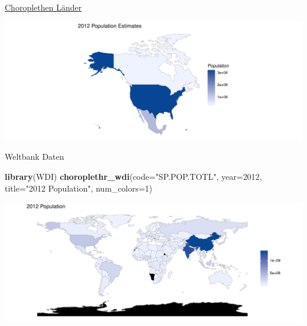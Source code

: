 \documentclass[ignorenonframetext,]{beamer}
\newenvironment{Shaded}{\begin{snugshade}}{\end{snugshade}}
\newcommand{\DataTypeTok}[1]{\textcolor[rgb]{0.13,0.29,0.53}{#1}}
\newcommand{\DecValTok}[1]{\textcolor[rgb]{0.00,0.00,0.81}{#1}}
\newcommand{\KeywordTok}[1]{\textcolor[rgb]{0.13,0.29,0.53}{\textbf{#1}}}
\newcommand{\NormalTok}[1]{#1}
\newcommand{\StringTok}[1]{\textcolor[rgb]{0.31,0.60,0.02}{#1}}
\begin{document}
\begin{frame}{\href{http://mirrors.softliste.de/cran/web/packages/choroplethr/vignettes/d-country-choropleth.html}{Choroplethen
Länder}}
\protect\hypertarget{choroplethen-lander-1}{}

\includegraphics{Choroplethen_files/figure-beamer/unnamed-chunk-26-1.pdf}

\end{frame}

\begin{frame}[fragile]{Weltbank Daten}
\protect\hypertarget{weltbank-daten}{}

\begin{Shaded}
\begin{Highlighting}[]
\KeywordTok{library}\NormalTok{(WDI) }
\KeywordTok{choroplethr_wdi}\NormalTok{(}\DataTypeTok{code=}\StringTok{"SP.POP.TOTL"}\NormalTok{, }\DataTypeTok{year=}\DecValTok{2012}\NormalTok{, }
                \DataTypeTok{title=}\StringTok{"2012 Population"}\NormalTok{, }
                \DataTypeTok{num_colors=}\DecValTok{1}\NormalTok{)}
\end{Highlighting}
\end{Shaded}

\includegraphics{Choroplethen_files/figure-beamer/unnamed-chunk-27-1.pdf}

\end{frame}
\end{document}
